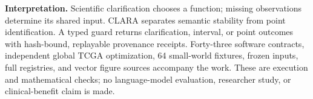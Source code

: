 \documentclass[11pt,letterpaper]{article}
\begin{document}
\medskip\noindent\textbf{Interpretation.} Scientific clarification chooses a function; missing observations determine its shared input. CLARA separates semantic stability from point identification. A typed guard returns clarification, interval, or point outcomes with hash-bound, replayable provenance receipts. Forty-three software contracts, independent global TCGA optimization, 64 small-world fixtures, frozen inputs, full registries, and vector figure sources accompany the work. These are execution and mathematical checks; no language-model evaluation, researcher study, or clinical-benefit claim is made.

\medskip{}
\end{document}
